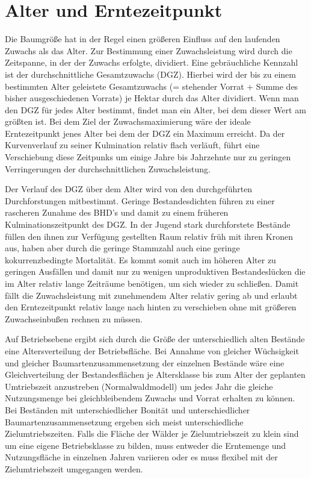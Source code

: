 \documentclass[twocolumn]{scrartcl}
\begin{document}
\section{Alter und Erntezeitpunkt}

Die Baumgröße hat in der Regel einen größeren Einfluss auf den laufenden Zuwachs
als das Alter. Zur Bestimmung einer Zuwachsleistung wird durch die Zeitspanne,
in der der Zuwachs erfolgte, dividiert. Eine gebräuchliche Kennzahl ist der
durchschnittliche Gesamtzuwachs (DGZ). Hierbei wird der bis zu einem bestimmten
Alter geleistete Gesamtzuwachs (= stehender Vorrat + Summe des bisher
ausgeschiedenen Vorrats) je Hektar durch das Alter dividiert. Wenn man den DGZ
für jedes Alter bestimmt, findet man ein Alter, bei dem dieser Wert am größten
ist. Bei dem Ziel der Zuwachsmaximierung wäre der ideale Erntezeitpunkt jenes
Alter bei dem der DGZ ein Maximum erreicht. Da der Kurvenverlauf zu seiner
Kulmination relativ flach verläuft, führt eine Verschiebung diese Zeitpunks um
einige Jahre bis Jahrzehnte nur zu geringen Verringerungen der
durchschnittlichen Zuwachsleistung.

Der Verlauf des DGZ über dem Alter wird von den durchgeführten Durchforstungen
mitbestimmt. Geringe Bestandesdichten führen zu einer rascheren Zunahme des
BHD's und damit zu einem früheren Kulminationszeitpunkt des DGZ. In der Jugend
stark durchforstete Bestände füllen den ihnen zur Verfügung gestellten Raum
relativ früh mit ihren Kronen aus, haben aber durch die geringe Stammzahl auch
eine geringe kokurrenzbedingte Mortalität. Es kommt somit auch im höheren Alter
zu geringen Ausfällen und damit nur zu wenigen unproduktiven Bestandeslücken die
im Alter relativ lange Zeiträume benötigen, um sich wieder zu schließen. Damit
fällt die Zuwachsleistung mit zunehmendem Alter relativ gering ab und erlaubt
den Erntezeitpunkt relativ lange nach hinten zu verschieben ohne mit größeren
Zuwachseinbußen rechnen zu müssen.

Auf Betriebsebene ergibt sich durch die Größe der unterschiedlich alten Bestände
eine Altersverteilung der Betriebsfläche. Bei Annahme von gleicher Wüchsigkeit
und gleicher Baumartenzusammensetzung der einzelnen Bestände wäre eine
Gleichverteilung der Bestandesflächen je Altersklasse bis zum Alter der
geplanten Umtriebszeit anzustreben (Normalwaldmodell) um jedes Jahr die gleiche
Nutzungsmenge bei gleichbleibendem Zuwachs und Vorrat erhalten zu können. Bei
Beständen mit unterschiedlicher Bonität und unterschiedlicher
Baumartenzusammensetzung ergeben sich meist unterschiedliche Zielumtriebszeiten.
Falls die Fläche der Wälder je Zielumtriebszeit zu klein sind um eine eigene
Betriebsklasse zu bilden, muss entweder die Erntemenge und Nutzungsfläche in
einzelnen Jahren variieren oder es muss flexibel mit der Zielumtriebszeit
umgegangen werden.
\end{document}
